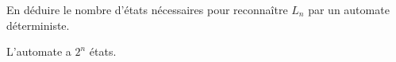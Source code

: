\begin{exercice}
  \begin{questions}
  \item En déduire le nombre d'états nécessaires pour reconnaître $L_n$ par un automate déterministe.
  \end{questions}
  \begin{corrections}
    L'automate a $2^n$ états. 
  \end{corrections}
  
\end{exercice}

\endgroup
\endinput
